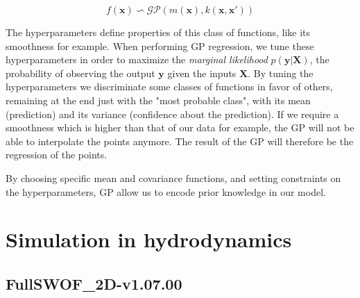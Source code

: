 \begin{equation}
  f(\bm{x}) \backsim \mathcal{GP}\left(m(\bm{x}), k(\bm{x},\bm{x}')\right)
\end{equation}

\noindent The hyperparameters define properties of this class of functions, like its smoothness for example.
When performing GP regression, we tune these hyperparameters in order to maximize the \emph{marginal likelihood} $p(\bm{y}\vert \bm{X})$, the probability of observing the output $\bm{y}$ given the inputs $\bm{X}$.
By tuning the hyperparameters we  discriminate some classes of functions in favor of others, remaining at the end just with the "most probable class", with its mean (prediction) and its variance (confidence about the prediction).
If we require a smoothness which is higher than that of our data for example, the GP will not be able to interpolate the points anymore.
The result of the GP will therefore be the regression of the points.

By choosing specific mean and covariance functions, and setting constraints on the hyperparameters, GP allow us to encode prior knowledge in our model.


  





\section{Simulation in hydrodynamics}



\subsection{FullSWOF\_2D-v1.07.00}


